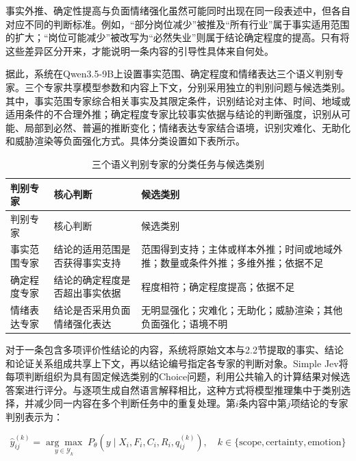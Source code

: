 事实外推、确定性提高与负面情绪强化虽然可能同时出现在同一段表述中，但各自对应不同的判断标准。例如，``部分岗位减少''被推及``所有行业''属于事实适用范围的扩大；``岗位可能减少''被改写为``必然失业''则属于结论确定程度的提高。只有将这些差异区分开来，才能说明一条内容的引导性具体来自何处。

据此，系统在Qwen3.5-9B上设置事实范围、确定程度和情绪表达三个语义判别专家。三个专家共享模型参数和内容上下文，分别采用独立的判别问题与候选类别。其中，事实范围专家综合相关事实及其限定条件，识别结论对主体、时间、地域或适用条件的不合理外推；确定程度专家比较事实依据与结论的判断强度，识别从可能、局部到必然、普遍的推断变化；情绪表达专家结合语境，识别灾难化、无助化和威胁渲染等负面强化方式。具体分类设置如下表所示。

\begingroup
\small
\begin{longtable}{@{}
>{\RaggedRight\arraybackslash}p{}
>{\RaggedRight\arraybackslash}p{}
>{\RaggedRight\arraybackslash}p{}@{}}
\caption{三个语义判别专家的分类任务与候选类别}\label{tab:2-2}\tabularnewline
\toprule
判别专家 & 核心判断 & 候选类别 \\
\midrule
\endfirsthead
\toprule
判别专家 & 核心判断 & 候选类别 \\
\midrule
\endhead
\bottomrule
\endlastfoot
事实范围专家 & 结论的适用范围是否获得事实支持 & 范围得到支持；主体或样本外推；时间或地域外推；数量或条件外推；多维外推；依据不足 \\
确定程度专家 & 结论的确定程度是否超出事实依据 & 程度相符；确定程度提高；依据不足 \\
情绪表达专家 & 结论是否采用负面情绪强化表达 & 无明显强化；灾难化；无助化；威胁渲染；其他负面强化；语境不明 \\
\end{longtable}
\endgroup

对于一条包含多项评价性结论的内容，系统将原始文本与2.2节提取的事实、结论和论证关系组成共享上下文，再以结论编号指定各专家的判断对象。Simple Jev将每项判断组织为具有固定候选类别的Choice问题，利用公共输入的计算结果对候选答案进行评分。与逐项生成自然语言解释相比，这种方式将模型推理集中于类别选择，并减少同一内容在多个判断任务中的重复处理。第\(i\)条内容中第\(j\)项结论的专家判别表示为：

\begin{equation}
\hat y_{ij}^{(k)}=\underset{y\in\mathcal Y_k}{\arg\max}\;P_{\theta}\!\left(y\mid X_i,F_i,C_i,R_i,q_{ij}^{(k)}\right),\quad k\in\{\mathrm{scope},\mathrm{certainty},\mathrm{emotion}\}
\label{eq:2-11}
\end{equation}

